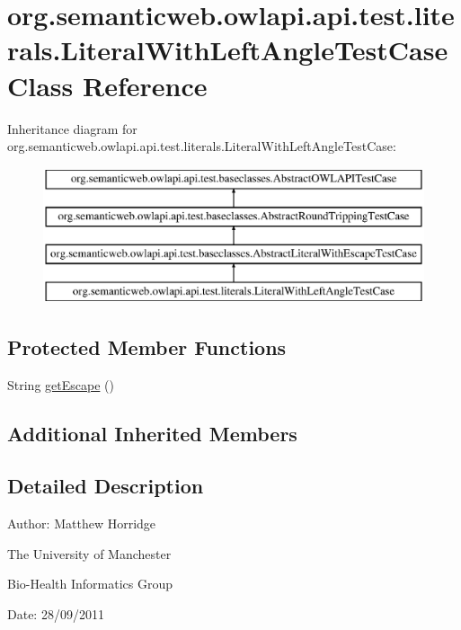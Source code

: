 \hypertarget{classorg_1_1semanticweb_1_1owlapi_1_1api_1_1test_1_1literals_1_1_literal_with_left_angle_test_case}{\section{org.\-semanticweb.\-owlapi.\-api.\-test.\-literals.\-Literal\-With\-Left\-Angle\-Test\-Case Class Reference}
\label{classorg_1_1semanticweb_1_1owlapi_1_1api_1_1test_1_1literals_1_1_literal_with_left_angle_test_case}
}
Inheritance diagram for org.\-semanticweb.\-owlapi.\-api.\-test.\-literals.\-Literal\-With\-Left\-Angle\-Test\-Case\-:\begin{figure}[H]
\begin{center}
\leavevmode
\includegraphics[height=4.000000cm]{classorg_1_1semanticweb_1_1owlapi_1_1api_1_1test_1_1literals_1_1_literal_with_left_angle_test_case}
\end{center}
\end{figure}
\subsection*{Protected Member Functions}
\begin{DoxyCompactItemize}
\item 
String \hyperlink{classorg_1_1semanticweb_1_1owlapi_1_1api_1_1test_1_1literals_1_1_literal_with_left_angle_test_case_ae5704a64c1246b52a303c533886a59df}{get\-Escape} ()
\end{DoxyCompactItemize}
\subsection*{Additional Inherited Members}


\subsection{Detailed Description}
Author\-: Matthew Horridge\par
 The University of Manchester\par
 Bio-\/\-Health Informatics Group\par
 Date\-: 28/09/2011 

